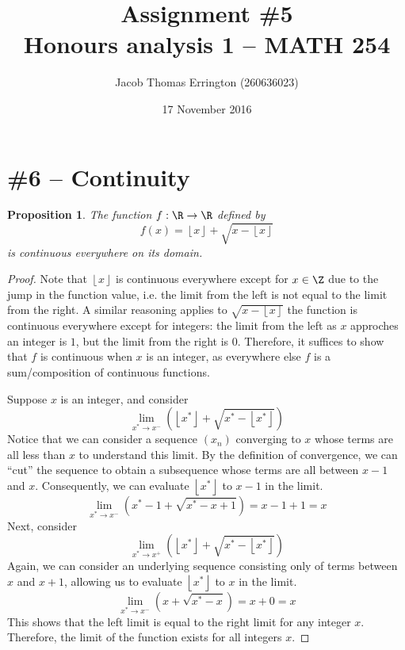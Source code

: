 \documentclass[letterpaper,11pt]{article}
\author{Jacob Thomas Errington (260636023)}
\title{Assignment \#5\\Honours analysis 1 -- MATH 254}
\date{17 November 2016}
\newcommand{\floor}[1]{\left\lfloor#1\right\rfloor}
\newcommand{\parens}[1]{\left(#1\right)}
\newtheorem{prop}{Proposition}
\begin{document}
\maketitle

\section*{\#6 -- Continuity}

\begin{prop}
    The function $f : \R \to \R$ defined by
    \begin{equation*}
        f(x) = \floor{x} + \sqrt{x - \floor{x}}
    \end{equation*}
    is continuous everywhere on its domain.
\end{prop}

\begin{proof}
    Note that $\floor{x}$ is continuous everywhere except for $x \in \Z$ due to
    the jump in the function value, i.e. the limit from the left is not equal
    to the limit from the right.
    A similar reasoning applies to $\sqrt{x - \floor{x}}$ the function is
    continuous everywhere except for integers: the limit from the left as $x$
    approches an integer is $1$, but the limit from the right is $0$.
    Therefore, it suffices to show that $f$ is continuous when $x$ is an
    integer, as everywhere else $f$ is a sum/composition of continuous
    functions.

    Suppose $x$ is an integer, and consider
    \begin{equation*}
        \lim_{x^* \to x^-}\parens{\floor{x^*} + \sqrt{x^* - \floor{x^*}}}
    \end{equation*}
    Notice that we can consider a sequence $(x_n)$ converging to $x$ whose
    terms are all less than $x$ to understand this limit. By the definition of
    convergence, we can ``cut'' the sequence to obtain a subsequence whose
    terms are all between $x - 1$ and $x$.
    Consequently, we can evaluate $\floor{x^*}$ to $x - 1$ in the limit.
    \begin{equation*}
        \lim_{x^* \to x^-}\parens{x^* - 1 + \sqrt{x^* - x + 1}}
        = x - 1 + 1
        = x
    \end{equation*}
    Next, consider
    \begin{equation*}
        \lim_{x^* \to x^+}\parens{\floor{x^*} + \sqrt{x^* - \floor{x^*}}}
    \end{equation*}
    Again, we can consider an underlying sequence consisting only of terms
    between $x$ and $x + 1$, allowing us to evaluate $\floor{x^*}$ to $x$ in
    the limit.
    \begin{equation*}
        \lim_{x^* \to x^-}\parens{x + \sqrt{x^* - x}}
        = x + 0
        = x
    \end{equation*}
    This shows that the left limit is equal to the right limit for any integer
    $x$. Therefore, the limit of the function exists for all integers $x$.


\end{proof}
\end{document}

